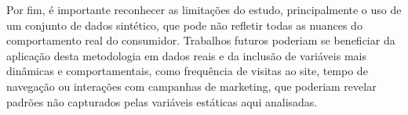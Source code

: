 Por fim, é importante reconhecer as limitações do estudo, principalmente o uso de um conjunto de dados sintético, que pode não refletir todas as nuances do comportamento real do consumidor. Trabalhos futuros poderiam se beneficiar da aplicação desta metodologia em dados reais e da inclusão de variáveis mais dinâmicas e comportamentais, como frequência de visitas ao site, tempo de navegação ou interações com campanhas de marketing, que poderiam revelar padrões não capturados pelas variáveis estáticas aqui analisadas.